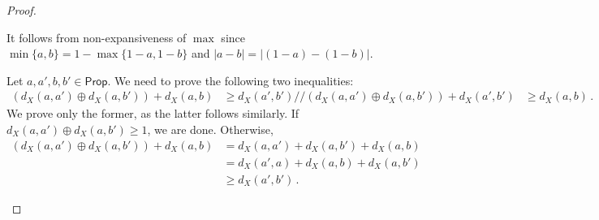 \documentclass[a4paper,UKenglish,cleveref, autoref, thm-restate]{lipics-v2021}
\newcommand{\Prop}{\mathsf{Prop}}
\begin{document}
\begin{proof}
\begin{description}[font=\sc,wide]
    \item[Case $\min$:]
    It follows from non-expansiveness of $\max$ since
    $\min\{a,b\} = 1-\max\{1-a,1-b\}$ and  $|a-b| = |(1-a)-(1-b)|$.

    \item[Case $d_X$:]
    Let $a,a',b,b'\in \Prop$. We need to prove the following two inequalities:
    \begin{align*}
        (d_X(a,a') \oplus d_X(a,b')) + d_X(a,b) &\geq d_X(a',b')
        //%
        (d_X(a,a') \oplus d_X(a,b')) + d_X(a',b') &\geq d_X(a,b) \,.
    \end{align*}
    We prove only the former, as the latter follows similarly.
    If $d_X(a,a') \oplus d_X(a,b') \geq 1$, we are done. Otherwise,
    \begin{align*}
        (d_X(a,a') \oplus d_X(a,b')) + d_X(a,b)
        &= d_X(a,a') + d_X(a,b') + d_X(a,b) \\
        &= d_X(a',a) + d_X(a,b) + d_X(a,b') \tag{symmetry} \\
        &\geq d_X(a',b') \,. \tag{triangular inequality}
    \end{align*}
    
\end{description}
\end{proof}
\end{document}
